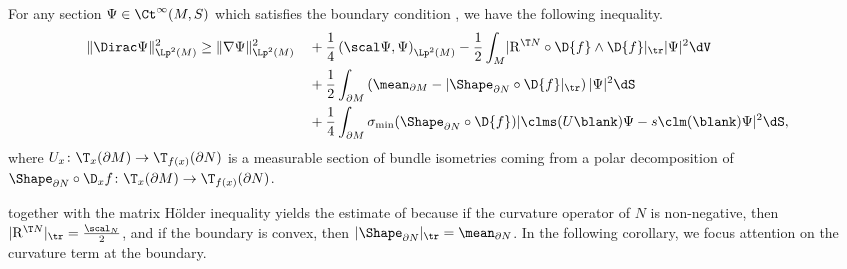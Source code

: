\documentclass[a4paper,11pt]{amsart}
\numberwithin{equation}{section}
\begin{document}
 \begin{proposition}\label{main_integral_inequality}
    For any section \(\Psi \in \Ct^\infty(M, S)\) which satisfies the boundary condition , we have the following inequality.
    \begin{alignat*}{2}
        \| \Dirac \Psi \|_{\Lp^2(M)}^2 &\geq \| \nabla \Psi \|_{\Lp^2(M)}^2 &&+ \frac{1}{4} \left(\scal \Psi, \Psi\right)_{\Lp^2(M)} - \frac{1}{2}\int_M \lvert \mathrm{R}^{\T N} \circ \D{f} \wedge \D{f} \rvert_{\tr} \lvert \Psi \rvert^2 \dV \\
    & &&+ \frac{1}{2} \int_{\partial M}  \left(\mean_{\partial M} - \lvert \Shape_{\partial N} \circ \D{f}|_{\tr} \right) |\Psi|^2 \dS \\
    & &&+ \frac{1}{4} \int_{\partial M}  \sigma_{\min}(\Shape_{\partial N} \circ \D{f}) \lvert \clms(U \blank) \Psi - s \clm(\blank) \Psi\rvert^2 \dS,
    \end{alignat*}
    where \(U_x \colon \T_{x}(\partial M) \to \T_{f(x)}(\partial N)\) is a measurable section of bundle isometries coming from a polar decomposition of \(\Shape_{\partial N} \circ \D_x f \colon \T_{x}(\partial M) \to \T_{f(x)}(\partial N)\).
\end{proposition}
 together with the matrix Hölder inequality  yields the estimate of \textcite{GoetteSemmelmann,listing2010scalar,Lott} because if the curvature operator of \(N\) is non-negative, then \(|\mathrm{R}^{\T N}|_{\tr} = \frac{\scal_N}{2}\), and if the boundary is convex, then \(|\Shape_{\partial N}|_{\tr} = \mean_{\partial N}\).
In the following corollary, we focus attention on the curvature term at the boundary.
\end{document}
